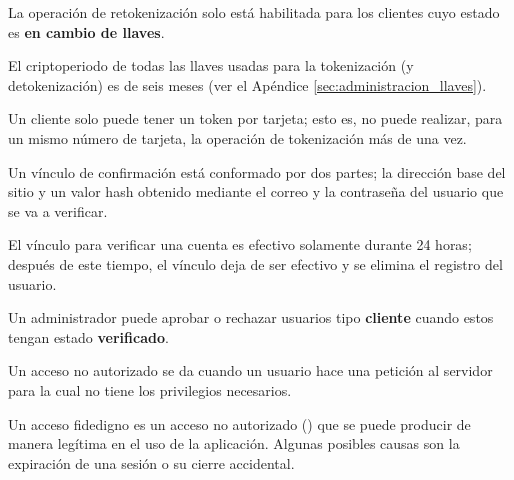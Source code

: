 {
  La operación de retokenización solo está habilitada para los clientes cuyo
  estado es \textbf{en cambio de llaves}.

}

{
  El criptoperiodo de todas las llaves usadas para la tokenización (y
  detokenización) es de seis meses (ver el Apéndice
  \ref{sec:administracion_llaves}).
}

{
  Un cliente solo puede tener un token por tarjeta; esto es, no puede realizar,
  para un mismo número de tarjeta, la operación de tokenización más de una vez.
}

{
  Un vínculo de confirmación está conformado por dos partes; la dirección base
  del sitio y un valor hash obtenido mediante el correo y la contraseña del
  usuario que se va a verificar.
}



{
  El vínculo para verificar una cuenta es efectivo solamente durante
  24 horas; después de este tiempo, el vínculo deja de ser efectivo y se elimina
  el registro del usuario.
}

{
  Un administrador puede aprobar o rechazar usuarios tipo \textbf{cliente}
  cuando estos tengan estado \textbf{verificado}.
}

{
  Un acceso no autorizado se da cuando un usuario hace una petición al servidor
  para la cual no tiene los privilegios necesarios.
}

{
  Un acceso fidedigno es un acceso no autorizado
  () que se puede producir de manera
  legítima en el uso de la aplicación. Algunas posibles causas son la expiración
  de una sesión o su cierre accidental.
}

